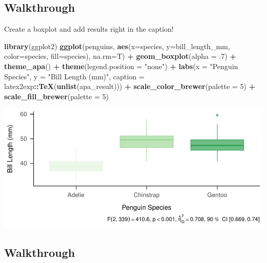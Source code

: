 \documentclass[
]{book}
\newenvironment{Shaded}{\begin{snugshade}}{\end{snugshade}}
\newcommand{\AttributeTok}[1]{\textcolor[rgb]{0.13,0.29,0.53}{#1}}
\newcommand{\DecValTok}[1]{\textcolor[rgb]{0.00,0.00,0.81}{#1}}
\newcommand{\FunctionTok}[1]{\textcolor[rgb]{0.13,0.29,0.53}{\textbf{#1}}}
\newcommand{\NormalTok}[1]{#1}
\newcommand{\SpecialCharTok}[1]{\textcolor[rgb]{0.81,0.36,0.00}{\textbf{#1}}}
\newcommand{\StringTok}[1]{\textcolor[rgb]{0.31,0.60,0.02}{#1}}
\begin{document}
\subsection{Walkthrough}\label{walkthrough-2}

Create a boxplot and add results right in the caption!

\begin{Shaded}
\begin{Highlighting}[]
\FunctionTok{library}\NormalTok{(ggplot2)}
\FunctionTok{ggplot}\NormalTok{(penguins, }\FunctionTok{aes}\NormalTok{(}\AttributeTok{x=}\NormalTok{species, }\AttributeTok{y=}\NormalTok{bill\_length\_mm, }\AttributeTok{color=}\NormalTok{species, }\AttributeTok{fill=}\NormalTok{species), }\AttributeTok{na.rm=}\NormalTok{T) }\SpecialCharTok{+}
  \FunctionTok{geom\_boxplot}\NormalTok{(}\AttributeTok{alpha =}\NormalTok{ .}\DecValTok{7}\NormalTok{) }\SpecialCharTok{+} \FunctionTok{theme\_apa}\NormalTok{() }\SpecialCharTok{+} \FunctionTok{theme}\NormalTok{(}\AttributeTok{legend.position =} \StringTok{"none"}\NormalTok{) }\SpecialCharTok{+}
  \FunctionTok{labs}\NormalTok{(}\AttributeTok{x =} \StringTok{"Penguin Species"}\NormalTok{, }\AttributeTok{y =} \StringTok{"Bill Length (mm)"}\NormalTok{, }
       \AttributeTok{caption =}\NormalTok{ latex2exp}\SpecialCharTok{::}\FunctionTok{TeX}\NormalTok{(}\FunctionTok{unlist}\NormalTok{(apa\_result))) }\SpecialCharTok{+}
  \FunctionTok{scale\_color\_brewer}\NormalTok{(}\AttributeTok{palette =} \DecValTok{5}\NormalTok{) }\SpecialCharTok{+}
  \FunctionTok{scale\_fill\_brewer}\NormalTok{(}\AttributeTok{palette =} \DecValTok{5}\NormalTok{)}
\end{Highlighting}
\end{Shaded}

\includegraphics{_main_files/figure-latex/unnamed-chunk-104-1.pdf}

\subsection{Walkthrough}\label{walkthrough-3}
\end{document}
